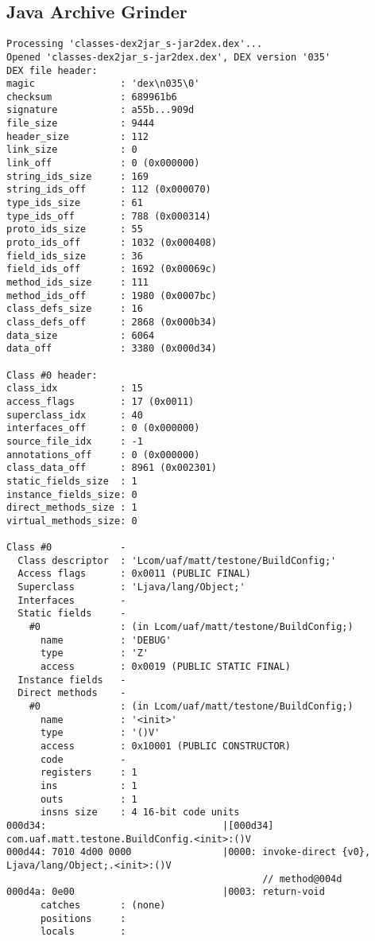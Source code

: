 \subsection{Java Archive Grinder}
\label{app:djarg}
\begin{lstlisting}
Processing 'classes-dex2jar_s-jar2dex.dex'...
Opened 'classes-dex2jar_s-jar2dex.dex', DEX version '035'
DEX file header:
magic               : 'dex\n035\0'
checksum            : 689961b6
signature           : a55b...909d
file_size           : 9444
header_size         : 112
link_size           : 0
link_off            : 0 (0x000000)
string_ids_size     : 169
string_ids_off      : 112 (0x000070)
type_ids_size       : 61
type_ids_off        : 788 (0x000314)
proto_ids_size      : 55
proto_ids_off       : 1032 (0x000408)
field_ids_size      : 36
field_ids_off       : 1692 (0x00069c)
method_ids_size     : 111
method_ids_off      : 1980 (0x0007bc)
class_defs_size     : 16
class_defs_off      : 2868 (0x000b34)
data_size           : 6064
data_off            : 3380 (0x000d34)

Class #0 header:
class_idx           : 15
access_flags        : 17 (0x0011)
superclass_idx      : 40
interfaces_off      : 0 (0x000000)
source_file_idx     : -1
annotations_off     : 0 (0x000000)
class_data_off      : 8961 (0x002301)
static_fields_size  : 1
instance_fields_size: 0
direct_methods_size : 1
virtual_methods_size: 0

Class #0            -
  Class descriptor  : 'Lcom/uaf/matt/testone/BuildConfig;'
  Access flags      : 0x0011 (PUBLIC FINAL)
  Superclass        : 'Ljava/lang/Object;'
  Interfaces        -
  Static fields     -
    #0              : (in Lcom/uaf/matt/testone/BuildConfig;)
      name          : 'DEBUG'
      type          : 'Z'
      access        : 0x0019 (PUBLIC STATIC FINAL)
  Instance fields   -
  Direct methods    -
    #0              : (in Lcom/uaf/matt/testone/BuildConfig;)
      name          : '<init>'
      type          : '()V'
      access        : 0x10001 (PUBLIC CONSTRUCTOR)
      code          -
      registers     : 1
      ins           : 1
      outs          : 1
      insns size    : 4 16-bit code units
000d34:                               |[000d34] com.uaf.matt.testone.BuildConfig.<init>:()V
000d44: 7010 4d00 0000                |0000: invoke-direct {v0}, Ljava/lang/Object;.<init>:()V
                                             // method@004d
000d4a: 0e00                          |0003: return-void
      catches       : (none)
      positions     :
      locals        :


\end{lstlisting}
